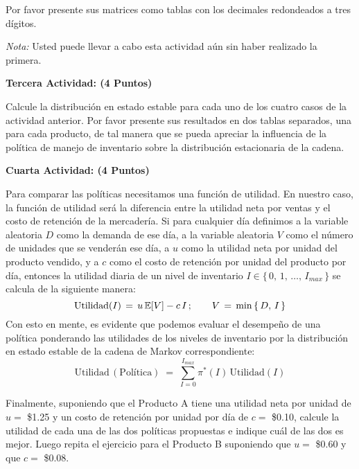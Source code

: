 \documentclass[ a4paper, twoside, 11pt]{article}
\begin{document}
\begin{problem}
Por favor presente sus matrices como tablas con los decimales redondeados a tres d\'igitos.

\emph{Nota:} Usted puede llevar a cabo esta actividad a\'un sin haber realizado la primera. 

\textbf{Tercera Actividad: (4 Puntos)}

Calcule la distribuci\'on en estado estable para cada uno de los cuatro casos de la actividad anterior. Por favor presente sus resultados en dos tablas separados, una para cada producto, de tal manera que se pueda apreciar la influencia de la pol\'itica de manejo de inventario sobre la distribuci\'on estacionaria de la cadena. 

\textbf{Cuarta Actividad: (4 Puntos)}

Para comparar las pol\'iticas necesitamos una funci\'on de utilidad. En nuestro caso, la funci\'on de utilidad ser\'a la diferencia entre la utilidad neta por ventas y el costo de retenci\'on de la mercader\'ia. Si para cualquier d\'ia definimos a la variable aleatoria $D$ como la demanda de ese d\'ia, \linebreak a la variable aleatoria $V$ como el n\'umero de unidades que se vender\'an ese d\'ia, a $u$ como la utilidad neta por unidad del producto vendido, y a $c$ como el costo de retenci\'on por unidad del producto por d\'ia, entonces la utilidad diaria de un nivel de inventario $I \in \{ \, 0, \, 1, \, \dots, \, I_{max} \, \}$ se calcula de la siguiente manera: 
\[
\text{Utilidad}(I) \, = \, 
u \, \mathbb{E}[ V ] - c \, I \, ; \qquad
V \, = \, \min \, \{ \, D, \, I \, \}
\]
Con esto en mente, es evidente que podemos evaluar el desempe\~no de una pol\'itica ponderando las utilidades de los niveles de inventario por la distribuci\'on en estado estable de la cadena de Markov correspondiente:
\[
\text{Utilidad} \, (\text{Pol\'itica}) \; = \; 
\sum_{ I = 0 }^{I_{max}} \pi^*(I) \, \text{Utilidad}(I)
\]

Finalmente, suponiendo que el Producto A tiene una utilidad neta por unidad de $u =$ \$1.25 y un costo de retenci\'on por unidad por d\'ia de $c =$ \$0.10, calcule la utilidad de cada una de las dos pol\'iticas propuestas e indique cu\'al de las dos es mejor. Luego repita el ejercicio para el Producto B suponiendo que $u =$ \$0.60 y que $c =$ \$0.08. 

\end{problem}
\vspace{\baselineskip}
\end{document}
